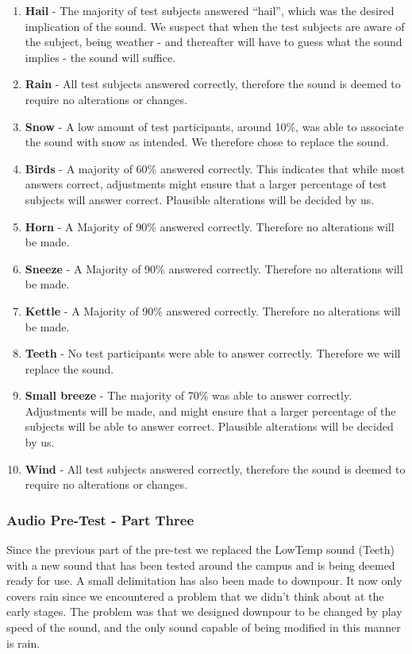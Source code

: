 \begin{enumerate}
    \item \textbf{Hail} - The majority of test subjects answered \enquote{hail}, which was the desired implication of the sound. 
    We suspect that when the test subjects are aware of the subject, being weather - and thereafter will have to guess what the sound implies - the sound will suffice.
    \item \textbf{Rain} - All test subjects answered correctly, therefore the sound is deemed to require no alterations or changes.
    \item \textbf{Snow} - A low amount of test participants, around 10\%, was able to associate the sound with snow as intended. We therefore chose to replace the sound.
    \item \textbf{Birds} - A majority of 60\% answered correctly. This indicates that while most answers correct, adjustments might ensure that a larger percentage of test subjects will answer correct. Plausible alterations will be decided by us.
    \item \textbf{Horn} - A Majority of 90\% answered correctly. Therefore no alterations will be made.
    \item \textbf{Sneeze} - A Majority of 90\% answered correctly. Therefore no alterations will be made.
    \item \textbf{Kettle} - A Majority of 90\% answered correctly. Therefore no alterations will be made.
    \item \textbf{Teeth} - No test participants were able to answer correctly. Therefore we will replace the sound.
    \item \textbf{Small breeze} - The majority of 70\% was able to answer correctly. Adjustments will be made, and might ensure that a larger percentage of the subjects will be able to answer correct. Plausible alterations will be decided by us.
    \item \textbf{Wind} - All test subjects answered correctly, therefore the sound is deemed to require no alterations or changes.
\end{enumerate}



\subsubsection{Audio Pre-Test - Part Three} %
\label{ssub:audio_pre_test_part_three}
Since the previous part of the pre-test we replaced the LowTemp sound (Teeth) with a new sound that has been tested around the campus and is being deemed ready for use. 
A small delimitation has also been made to downpour. 
It now only covers rain since we encountered a problem that we didn’t think about at the early stages. 
The problem was that we designed downpour to be changed by play speed of the sound, and the only sound capable of being modified in this manner is rain.

